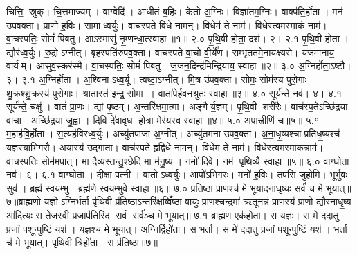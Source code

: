 

\setcounter{anuvakam}{0}
चित्ति॒ स्रुक्। चि॒त्तमाज्यम्। वाग्वेदि॑। आधी॑तं ब॒\ar{}हिः। केतो॑ अ॒ग्निः। विज्ञा॑तम॒ग्निः। वाक्प॑ति॒र्\mbox{}होता। मन॑ उपव॒क्ता। प्रा॒णो ह॒विः। सामाध्व॒र्युः। वाच॑स्पते विधे नामन्। वि॒धेम॑ ते॒ नाम॑। वि॒धेस्त्वम॒स्माकं॒ नाम॑। वा॒चस्पतिः॒ सोमं॑ पिबतु। आऽस्मासु॑ नृ॒म्णन्धा॒त्स्वाहा॥१॥
२.०
पृ॒थि॒वी होता॒ दश॑। २।
२.१
पृ॒थि॒वी होता। द्यौर॑ध्व॒र्युः। रु॒द्रोऽग्नीत्। बृह॒स्पति॑रुपव॒क्ता। वाच॑स्पते वा॒चो वी॒र्ये॑ण। सम्भृ॑ततमे॒नाय॑क्ष्यसे। यज॑मानाय॒ वार्यम्। आसुव॒स्कर॑स्मै। वा॒चस्पतिः॒ सोमं॑ पिबतु। ज॒जन॒दिन्द्र॑मिन्द्रि॒याय॒ स्वाहा॥२॥%
३.०
अ॒ग्निर्होता॒ऽष्टौ। ३।
\anuvakamend
३.१
अ॒ग्निर्\mbox{}होता। अ॒श्विनाऽध्व॒र्यू। त्वष्टा॒ऽग्नीत्। मि॒त्र उ॑पव॒क्ता। सोमः॒ सोम॑स्य पुरो॒गाः। शु॒क्रश्शु॒क्रस्य॑ पुरो॒गाः। श्रा॒तास्त॑ इन्द्र॒ सोमा। वाता॑पेर्\mbox{}हवन॒श्रुतः॒ स्वाहा॥३॥%
४.०
सूर्य॑न्ते॒ नव॑। ४।
\anuvakamend
४.१
सूर्य॑न्ते॒ चक्षु॑। वातं॑ प्रा॒णः। द्यां पृ॒ष्ठम्। अ॒न्तरि॑क्षमा॒त्मा। अङ्गैर्\mbox{}य॒ज्ञम्। पृ॒थि॒वी शरी॑रैः। वाच॑स्प॒तेऽच्छि॑द्रया वा॒चा। अच्छि॑द्रया जु॒ह्वा। दि॒वि दे॑वा॒वृध॒ होत्रा॒ मेर॑यस्व॒ स्वाहा॥४॥
५.०
अ॒पा॒त्त्रीणि॑ च॥५॥%
\anuvakamend
५.१
म॒हाह॑वि॒र्\mbox{}होता। स॒त्यह॑विरध्व॒र्युः। अच्यु॑तपाजा अ॒ग्नीत्। अच्यु॑तमना उपव॒क्ता। अ॒ना॒धृ॒ष्यश्चाप्रतिधृ॒ष्यश्च॑ य॒ज्ञस्या॑भिग॒रौ। अ॒यास्य॑ उद्गा॒ता। वाच॑स्पते हृद्विधे नामन्। वि॒धेम॑ ते॒ नाम॑। वि॒धेस्त्वम॒स्माक॒न्नाम॑। वा॒चस्पतिः॒ सोम॑मपात्। मा दैव्य॒स्तन्तु॒श्छेदि॒ मा म॑नु॒ष्य॑। नमो॑ दि॒वे। नम॑ पृथि॒व्यै स्वाहा॥५॥%
६.०
वाग्घोता॒ नव॑। ६।
\anuvakamend
६.१
वाग्घोता। दी॒क्षा पत्नी। वातोऽध्व॒र्युः। आपो॑ऽभिग॒रः। मनो॑ ह॒विः। तप॑सि जुहोमि। भूर्भुवः॒ सुव॑। ब्रह्म॑ स्वय॒म्भु। ब्रह्म॑णे स्वय॒म्भुवे॒ स्वाहा॥६॥
७.०
प्र॒ति॒ष्ठा प्रा॒णश्च॑ मे भूयादनाधृ॒ष्यः सर्वं॑ च मे भूयात्॥ ७॥ब्रा॒ह्म॒णो य॒ज्ञोऽग्निर्भ॒र्ता पृ॑थि॒वी प्र॑ति॒ष्ठाऽन्तरि॑क्षव्विँ॒ष्ठा वा॒युः प्रा॒णश्च॒न्द्रमा॑ ऋ॒तूनन्नं॑ प्रा॒णस्य॑ प्रा॒णो द्यौर॑नाधृ॒ष्य आ॑दि॒त्यः स ते॑ज॒स्वी प्र॒जाप॑तिरि॒द सर्व॒ सर्व॑ञ्च मे भूयात्॥
\anuvakamend
७.१
ब्रा॒ह्म॒ण एक॑होता। स य॒ज्ञः। स मे॑ ददातु प्र॒जां प॒शून्पुष्टिं॒ यश॑। य॒ज्ञश्च॑ मे भूयात्। अ॒ग्निर्द्विहो॑ता। स भ॒र्ता। स मे॑ ददातु प्र॒जां प॒शून्पुष्टिं॒ यश॑। भ॒र्ता च॑ मे भूयात्। पृ॒थि॒वी त्रिहो॑ता। स प्र॑ति॒ष्ठा॥७॥%
